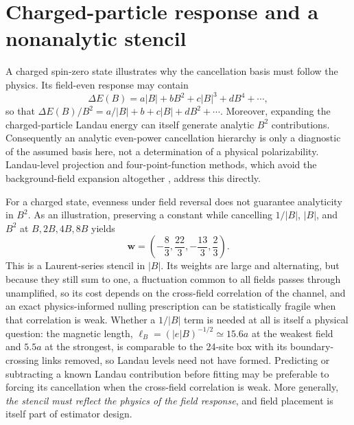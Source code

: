 \documentclass[aps,prd,preprint,nofootinbib,floatfix]{revtex4-2}
\begin{document}
\section{Charged-particle response and a nonanalytic stencil}
\label{app:pion}

A charged spin-zero state illustrates why the cancellation basis must follow the physics. Its field-even response may contain
\begin{equation}
\Delta E(B)=a|B|+bB^2+c|B|^3+dB^4+\cdots,
\label{eq:landau}
\end{equation}
so that $\Delta E(B)/B^2=a/|B|+b+c|B|+dB^2+\cdots$. Moreover, expanding the charged-particle Landau energy can itself generate analytic $B^2$ contributions. Consequently an analytic even-power cancellation hierarchy is only a diagnostic of the assumed basis here, not a determination of a physical polarizability. Landau-level projection \cite{TiburziVayl2013,Bignell2020Pion} and four-point-function methods, which avoid the background-field expansion altogether \cite{Lee2023PionElec4pt,Lee2023PionMag4pt}, address this directly.

For a charged state, evenness under field reversal does not guarantee analyticity in $B^2$. As an illustration, preserving a constant while cancelling $1/|B|$, $|B|$, and $B^2$ at $B,2B,4B,8B$ yields
\begin{equation}
\bm w=\left(-\frac83,\frac{22}{3},-\frac{13}{3},\frac23\right).
\end{equation}
This is a Laurent-series stencil in $|B|$. Its weights are large and alternating, but because they still sum to one, a fluctuation common to all fields passes through unamplified, so its cost depends on the cross-field correlation of the channel, and an exact physics-informed nulling prescription can be statistically fragile when that correlation is weak. Whether a $1/|B|$ term is needed at all is itself a physical question: the magnetic length, $\ell_B=(|e|B)^{-1/2}\simeq 15.6a$ at the weakest field and $5.5a$ at the strongest, is comparable to the 24-site box with its boundary-crossing links removed, so Landau levels need not have formed. Predicting or subtracting a known Landau contribution before fitting may be preferable to forcing its cancellation when the cross-field correlation is weak. More generally, \emph{the stencil must reflect the physics of the field response}, and field placement is itself part of estimator design.



\end{document}

